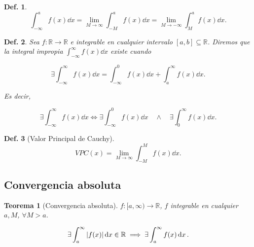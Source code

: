\documentclass{article}
\theoremstyle{definicion}
\newtheorem{definicion}{Def.}
\theoremstyle{definition}             %
\theoremstyle{definition}             %
\theoremstyle{definition}
\theoremstyle{definition}
\theoremstyle{observacion}
\theoremstyle{definition}
\theoremstyle{plain}
\newtheorem{theorem}{Teorema}
\theoremstyle{definition}
\theoremstyle{afirmacion}
\theoremstyle{definition}
\begin{document}
    \begin{definicion}
        \vphantom{afjdhgsjlfalhjdfkajfjhfdajsd}
        \begin{equation*}
            \int_{-\infty}^{a}f(x)\dd{x} = \lim_{M\to\infty}\int_{-M}^{a}f(x)\dd{x} = \lim_{M\to - \infty}\int_{M}^{a}f(x)\dd{x}.
        \end{equation*}
    \end{definicion}

    \begin{definicion}
        Sea \(f\colon \mathbb{R}\to\mathbb{R}\) e integrable en cualquier intervalo \([a,b]\subseteq \mathbb{R}\). Diremos que la integral impropia \(\int_{-\infty}^{\infty}f(x)\dd{x}\) existe cuando 

        \begin{equation*}
            \exists \int_{-\infty}^{\infty}f(x)\dd{x} = \int_{-\infty}^{0}f(x)\dd{x} + \int_{a}^{\infty}f(x)\dd{x}.
        \end{equation*}

        Es decir,

        \begin{equation*}
            \exists \int_{-\infty}^{\infty}f(x)\dd{x} \Leftrightarrow \exists \int_{-\infty}^{0}f(x)\dd{x}\quad \wedge \quad \exists\int_{0}^{\infty}f(x)\dd{x}.
        \end{equation*}
    \end{definicion}

    \begin{definicion}[Valor Principal de Cauchy]
        \begin{equation*}
            VPC(x) = \lim_{M\to\infty} \int_{-M}^{M}f(x)\dd{x}.
        \end{equation*}
    \end{definicion}

    \subsection{Convergencia absoluta}

    \begin{theorem}[Convergencia absoluta]
        \(f\colon [a,\infty) \to \mathbb{R}\), \(f\) integrable en cualquier \(a, M\), \(\forall M > a\).
        
        \begin{equation*}
            \exists \int_{a}^{\infty} \abs{f(x)}\dd{x} \in \mathbb{R} \implies \exists \int_{a}^{\infty}f(x)\dd{x}.
        \end{equation*}
    \end{theorem}
\end{document}
